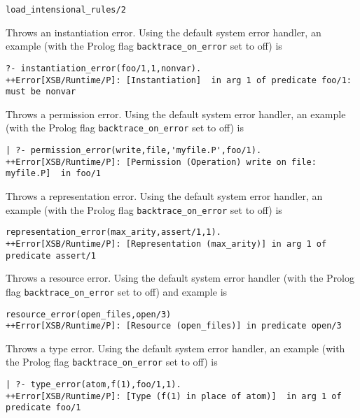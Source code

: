 \begin{description}
{\begin{verbatim}
load_intensional_rules/2
\end{verbatim}
}
%
%
Throws an instantiation error.  Using the default system error
handler, an example (with the Prolog flag {\tt backtrace\_on\_error}
set to off) is {\small
\begin{verbatim}
?- instantiation_error(foo/1,1,nonvar).
++Error[XSB/Runtime/P]: [Instantiation]  in arg 1 of predicate foo/1: must be nonvar
\end{verbatim}
}
%
%
Throws a permission error.  Using the default system error handler, an
example (with the Prolog flag {\tt backtrace\_on\_error} set to off)
is {\small
\begin{verbatim}
| ?- permission_error(write,file,'myfile.P',foo/1).
++Error[XSB/Runtime/P]: [Permission (Operation) write on file: myfile.P]  in foo/1
\end{verbatim}
}
%
% 
Throws a representation error.  Using the default system error handler, an
example (with the Prolog flag {\tt backtrace\_on\_error} set to off) is {\small
\begin{verbatim}
representation_error(max_arity,assert/1,1).
++Error[XSB/Runtime/P]: [Representation (max_arity)] in arg 1 of predicate assert/1
\end{verbatim} }
%
%
Throws a resource error.  Using the default system error handler
(with the Prolog flag {\tt backtrace\_on\_error} set to off) and example is {\small
\begin{verbatim}
resource_error(open_files,open/3)
++Error[XSB/Runtime/P]: [Resource (open_files)] in predicate open/3
\end{verbatim} }
%
%
Throws a type error.  Using the default system error handler, an
example (with the Prolog flag {\tt backtrace\_on\_error} set to off)
is {\small
\begin{verbatim}
| ?- type_error(atom,f(1),foo/1,1).
++Error[XSB/Runtime/P]: [Type (f(1) in place of atom)]  in arg 1 of predicate foo/1
\end{verbatim}
}
%

\end{description}
